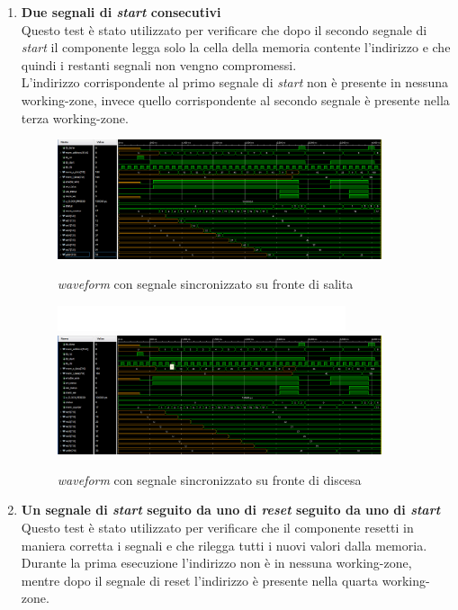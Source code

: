 \documentclass{article}
\begin{document}
\begin{enumerate}
\item\textbf{Due segnali di \textit{start} consecutivi}\\
Questo test è stato utilizzato per verificare che dopo il secondo segnale di \textit{start} il componente legga solo la cella della memoria contente l'indirizzo e che quindi i restanti segnali non vengno compromessi.\\L'indirizzo corrispondente al primo segnale di \textit{start} non è presente in nessuna working-zone, invece quello corrispondente al secondo segnale è presente nella terza working-zone.
\begin{figure}[h]
    \centering
    \includegraphics[width=0.9\textwidth]{double_start_no_in_f1}
    \caption{\textit{waveform} con segnale sincronizzato su fronte di salita}
    \includegraphics[width=0.8\textwidth]{spazio}
    \includegraphics[width=0.9\textwidth]{double_start_no_in_f0}
    \caption{\textit{waveform} con segnale sincronizzato su fronte di discesa}
\end{figure}
\pagebreak
\item\textbf{Un segnale di \textit{start} seguito da uno di \textit{reset} seguito da uno di \textit{start}}\\
Questo test è stato utilizzato per verificare che il componente resetti in maniera corretta i segnali e che rilegga tutti i nuovi valori dalla memoria.\\Durante la prima esecuzione l'indirizzo non è in nessuna working-zone, mentre dopo il segnale di reset l'indirizzo è presente nella quarta working-zone.

\end{enumerate}
\end{document}

